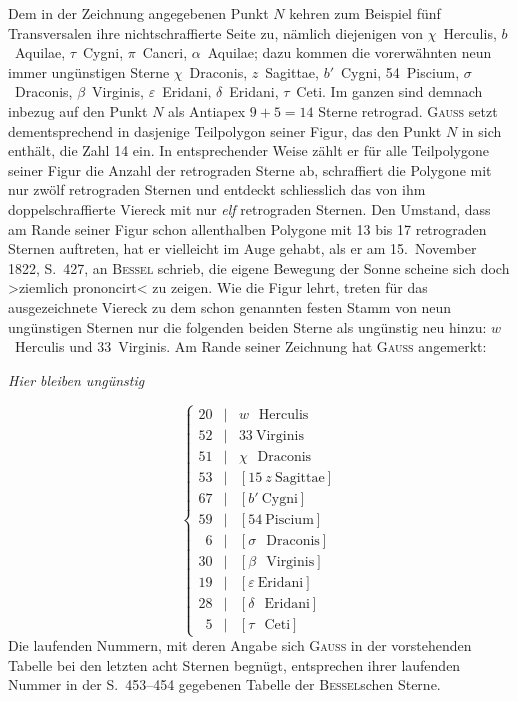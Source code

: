 \documentclass[12pt,a4paper]{article}
\theoremstyle{plain}
\theoremstyle{definition}
\theoremstyle{remark}
\begin{document}
\begin{small}
Dem in der Zeichnung angegebenen Punkt $N$ kehren zum Beispiel f\"unf
Transversalen ihre nichtschraffierte Seite zu, n\"amlich diejenigen von
$\chi$~Herculis, $b$~Aquilae, $\tau$~Cygni, $\pi$~Cancri, $\alpha$~Aquilae; dazu
kommen die vorerw\"ahnten neun immer ung\"unstigen Sterne $\chi$~Draconis,
$z$~Sagittae, $b'$~Cygni, 54~Piscium, $\sigma$~Draconis, $\beta$~Virginis,
$\varepsilon$~Eridani, $\delta$~Eridani, $\tau$~Ceti. Im ganzen sind demnach inbezug
auf den Punkt $N$ als Antiapex $9 + 5 = 14$ Sterne retrograd. \textsc{Gauss} setzt
dementsprechend in dasjenige Teilpolygon seiner Figur, das den Punkt $N$ in sich
enth\"alt, die Zahl 14 ein. In entsprechender Weise z\"ahlt er f\"ur alle Teilpolygone
seiner Figur die Anzahl der retrograden Sterne ab, schraffiert die Polygone mit
nur zw\"olf retrograden Sternen und entdeckt schliesslich das von ihm doppelschraffierte
Viereck mit nur \textit{elf} retrograden Sternen. Den Umstand, dass am Rande seiner
Figur schon allenthalben Polygone mit 13 bis 17 retrograden Sternen auftreten, hat
er vielleicht im Auge gehabt, als er am 15.~November 1822, S.~427, an \textsc{Bessel}
schrieb, die eigene Bewegung der Sonne scheine sich doch \textgreater{}ziemlich prononcirt\textless{}
zu zeigen. Wie die Figur lehrt, treten f\"ur das ausgezeichnete Viereck zu dem
schon genannten festen Stamm von neun ung\"unstigen Sternen nur die folgenden
beiden Sterne als ung\"unstig neu hinzu: $w$~Herculis und 33~Virginis. Am Rande
seiner Zeichnung hat \textsc{Gauss} angemerkt:

\begin{center}
\textit{Hier bleiben ung\"unstig}
\end{center}
\begin{equation}\tag{27}
\left\{\begin{array}{rcl}
20 & | & w\phantom{o}\ \text{Herculis}\\
52 & | & 33\ \text{Virginis}\\
51 & | & \chi\phantom{o}\ \text{Draconis}\\
53 & | & [15\ z\ \text{Sagittae}]\\
67 & | & [b'\ \text{Cygni}]\\
59 & | & [54\ \text{Piscium}]\\
\phantom{0}6 & | & [\sigma\phantom{0}\ \text{Draconis}]\\
30 & | & [\beta\phantom{0}\ \text{Virginis}]\\
19 & | & [\varepsilon\ \text{Eridani}]\\
28 & | & [\delta\phantom{0}\ \text{Eridani}]\\
\phantom{0}5 & | & [\tau\phantom{0}\ \text{Ceti}]
\end{array}\right.\end{equation}
Die laufenden Nummern, mit deren Angabe sich \textsc{Gauss} in der vorstehenden Tabelle
bei den letzten acht Sternen begn\"ugt, entsprechen ihrer laufenden Nummer in der
S.~453--454 gegebenen Tabelle der \textsc{Bessel}schen Sterne.


\end{small}
\end{document}

